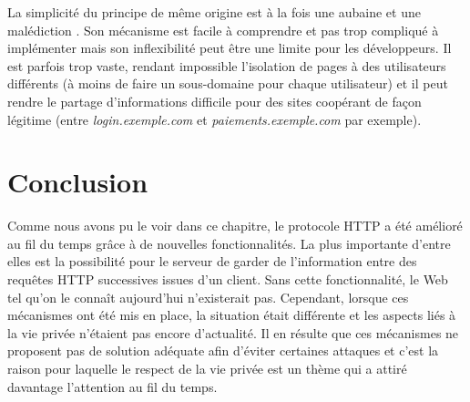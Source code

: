 La simplicité du principe de même origine est à la fois une aubaine et une malédiction \cite{zalewski2012tangled}. Son mécanisme est facile à comprendre et pas trop compliqué à implémenter mais son inflexibilité peut être une limite pour les développeurs. Il est parfois trop vaste, rendant impossible l'isolation de pages à des utilisateurs différents (à moins de faire un sous-domaine pour chaque utilisateur) et il peut rendre le partage d'informations difficile pour des sites coopérant de façon légitime (entre \textit{login.exemple.com} et \textit{paiements.exemple.com} par exemple).

\section{Conclusion}
Comme nous avons pu le voir dans ce chapitre, le protocole HTTP a été amélioré au fil du temps grâce à de nouvelles fonctionnalités. La plus importante d'entre elles est la possibilité pour le serveur de garder de l'information entre des requêtes HTTP successives issues d'un client. Sans cette fonctionnalité, le Web tel qu'on le connaît aujourd'hui n'existerait pas. Cependant, lorsque ces mécanismes ont été mis en place, la situation était différente et les aspects liés à la vie privée n'étaient pas encore d'actualité. Il en résulte que ces mécanismes ne proposent pas de solution adéquate afin d'éviter certaines attaques et c'est la raison pour laquelle le respect de la vie privée est un thème qui a attiré davantage l'attention au fil du temps.

